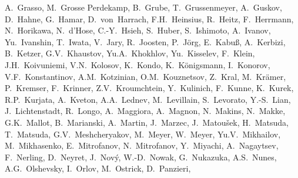 \begin{flushleft}
A.~Grasso,
M.~Grosse Perdekamp,
B.~Grube,
T.~Grussenmeyer,
A.~Guskov, %
D.~Hahne,
G.~Hamar,
D.~von~Harrach,
F.H.~Heinsius,
R.~Heitz,
F.~Herrmann,
N.~Horikawa,
N.~d'Hose,
C.-Y.~Hsieh,
S.~Huber,
S.~Ishimoto,
A.~Ivanov,
Yu.~Ivanshin, %
T.~Iwata,
V.~Jary,
R.~Joosten,
P.~J\"org,
E.~Kabu\ss{},
A.~Kerbizi,
B.~Ketzer,%
G.V.~Khaustov,
Yu.A.~Khokhlov,
Yu.~Kisselev, %
F.~Klein,
J.H.~Koivuniemi,
V.N.~Kolosov,
K.~Kondo,
K.~K\"onigsmann,
I.~Konorov,
V.F.~Konstantinov,
A.M.~Kotzinian,
O.M.~Kouznetsov, %
Z.~Kral,
M.~Kr\"amer,
P.~Kremser,
F.~Krinner,
Z.V.~Kroumchtein\Deceased, %
Y.~Kulinich,
F.~Kunne,
K.~Kurek,
R.P.~Kurjata,
A.~Kveton,
A.A.~Lednev\Deceased,
M.~Levillain,
S.~Levorato,
Y.-S.~Lian,
J.~Lichtenstadt,
R.~Longo,
A.~Maggiora,
A.~Magnon,
N.~Makins,
N.~Makke,
G.K.~Mallot\CorAuth,
B.~Marianski,
A.~Martin,
J.~Marzec,
J.~Matou{\v s}ek,  %
H.~Matsuda,
T.~Matsuda,
G.V.~Meshcheryakov, %
M.~Meyer,
W.~Meyer,
Yu.V.~Mikhailov,
M.~Mikhasenko,
E.~Mitrofanov,  %
N.~Mitrofanov,  %
Y.~Miyachi,
A.~Nagaytsev, %
F.~Nerling,
D.~Neyret,
J.~Nov{\'y},
W.-D.~Nowak,
G.~Nukazuka,
A.S.~Nunes,
A.G.~Olshevsky, %
I.~Orlov, %
M.~Ostrick,
D.~Panzieri,

\end{flushleft}

